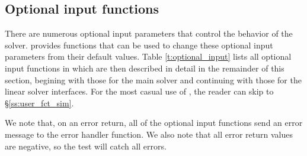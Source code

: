 \subsection{Optional input functions}\label{ss:optional_input}

There are numerous optional input parameters that control the behavior
of the {\cvode} solver.  {\cvode} provides functions that can be used to change
these optional input parameters from their default values. 
Table \ref{t:optional_input} lists all optional input functions in {\cvode} which 
are then described in detail in the remainder of this section, begining with those
for the main {\cvode} solver and continuing with those for the linear
solver interfaces.  For the most casual use of {\cvode}, the reader
can skip to \S\ref{ss:user_fct_sim}. 

We note that, on an error return, all of the optional input functions send an
error message to the error handler function. 
We also note that all error return values are negative, so the test 
will catch all errors.

